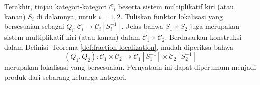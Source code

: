 \begin{catatan}\label{rem:localization-product-cat}
	Terakhir, tinjau kategori-kategori $\mathcal{C}_i$ beserta sistem
	multiplikatif kiri (atau kanan) $S_i$ di dalamnya, untuk $i=1,2$. Tuliskan
	funktor lokalisasi yang bersesuaian sebagai
	$Q_i:\mathcal{C}_i\to\mathcal{C}_i[S_i^{-1}]$. Jelas bahwa
	$S_1\times S_2$ juga merupakan sistem multiplikatif kiri (atau kanan)
	dalam $\mathcal{C}_1\times\mathcal{C}_2$. Berdasarkan konstruksi dalam
	Definisi--Teorema \ref{def:fraction-localization}, mudah diperiksa bahwa
	\[ (Q_1, Q_2): \mathcal{C}_1 \times \mathcal{C}_2 \to \mathcal{C}_1[S_1^{-1}] \times \mathcal{C}_2[S_2^{-1}] \]
	merupakan lokalisasi yang bersesuaian. Pernyataan ini dapat diperumum
	menjadi produk dari sebarang keluarga kategori.
\end{catatan}
